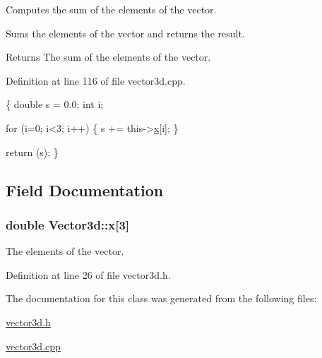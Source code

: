 Computes the sum of the elements of the vector. 

Sums the elements of the vector and returns the result. \begin{DoxyReturn}{Returns}
The sum of the elements of the vector. 
\end{DoxyReturn}


Definition at line 116 of file vector3d.\-cpp.


\begin{DoxyCode}
\{
  \textcolor{keywordtype}{double} s = 0.0;
  \textcolor{keywordtype}{int} i;
  
  \textcolor{keywordflow}{for} (i=0; i<3; i++)
    \{
      s += this->\hyperlink{classVector3d_ae5e82a2be7cc2e195e56875a5befe509}{x}[i];
    \}
  
  \textcolor{keywordflow}{return} (s);
\}
\end{DoxyCode}


\subsection{Field Documentation}
\hypertarget{classVector3d_ae5e82a2be7cc2e195e56875a5befe509}{
\subsubsection[{x}]{\setlength{\rightskip}{0pt plus 5cm}double Vector3d\-::x\mbox{[}3\mbox{]}\hspace{0.3cm}{\ttfamily [protected]}}}\label{df/dd0/classVector3d_ae5e82a2be7cc2e195e56875a5befe509}


The elements of the vector. 



Definition at line 26 of file vector3d.\-h.



The documentation for this class was generated from the following files\-:\begin{DoxyCompactItemize}
\item 
\hyperlink{vector3d_8h}{vector3d.\-h}\item 
\hyperlink{vector3d_8cpp}{vector3d.\-cpp}\end{DoxyCompactItemize}

